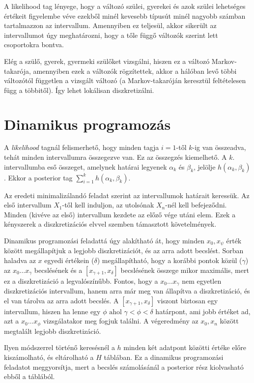 A likelihood tag lényege, hogy a változó szülei, gyerekei és azok szülei lehetséges értékeit figyelembe véve ezekből minél kevesebb típusút minél nagyobb számban tartalmazzon az intervallum. Amennyiben ez teljesül, akkor sikerült az intervallumot úgy meghatározni, hogy a tőle függő változók szerint lett csoportokra bontva.

Elég a szülő, gyerek, gyermeki szülőket vizsgálni, hiszen ez a változó Markov-takarója, amennyiben ezek a változók rögzítettek, akkor a hálóban levő többi változótól független a vizsgált változó (a Markov-takaróján keresztül feltételesen függ a többitől). Így lehet lokálisan diszkretizálni.

\section{Dinamikus programozás}
A \textit{likelihood} tagnál felismerhető, hogy minden tagja $i=1$-től $k$-ig van összeadva, tehát minden intervallumra összegezve van. Ez az összegzés kiemelhető. A $k.$ intervallumba eső összeget, amelynek határai legyenek $\alpha_{k}$ és $\beta_{k}$, jelölje $h(\alpha_{k}, \beta_{k})$. Ekkor a posterior tag $\sum_{i = 1}^{k} h(\alpha_{k}, \beta_{k})$.

Az eredeti minimalizálandó feladat szerint az intervallumok határait keressük. Az első intervallum $X_{1}$-től kell induljon, az utolsónak $X_{n}$-nél kell befejeződni. Minden (kivéve az első) intervallum kezdete az előző vége utáni elem. Ezek a kényszerek a diszkretizációs elvvel szemben támasztott követelmények.

Dinamikus programozási feladattá úgy alakítható át, hogy minden $x_{0}, x_{\psi}$ érték között megállapítjuk a legjobb diszkretizációt, és az arra adott becslést. Sorban haladva az $x$ egyedi értékein ($\delta$) megállapítható, hogy a korábbi pontok közül ($\gamma$) az $x_{0} \dots x_{\gamma}$ becslésének és a $[x_{\gamma + 1}, x_{\delta}]$ becslésének összege mikor maximális, mert ez a diszkretizáció a legvalószínűbb. Fontos, hogy a $x_{0} \dots x_{\gamma}$ nem egyetlen diszkretizációs intervallum, hanem arra már meg van állapítva a diszkretizáció, és el van tárolva az arra adott becslés. A $[x_{\gamma + 1}, x_{\delta}]$ viszont biztosan egy intervallum, hiszen ha lenne egy $\phi \mbox{ ahol } \gamma < \phi < \delta$ határpont, ami jobb értéket ad, azt a $x_{0} \dots x_{\phi}$ vizsgálatakor meg fogjuk találni. A végeredmény az $x_{0}, x_{n}$ között megtalált legjobb diszkretizáció.

Ilyen módszerrel történő keresésnél a $h$ minden két adatpont közötti értéke előre kiszámolható, és eltárolható a $H$ táblában. Ez a dinamikus programozási feladatot meggyorsítja, mert a becslés számolásánál a posterior rész kiolvasható ebből a táblából.

